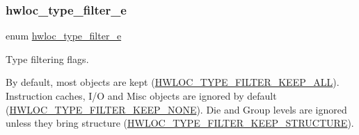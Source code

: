 \subsubsection{\texorpdfstring{hwloc\+\_\+type\+\_\+filter\+\_\+e}{hwloc\_type\_filter\_e}}
{\footnotesize\ttfamily enum \hyperlink{a00193_ga9a5a1f0140cd1952544477833733195b}{hwloc\+\_\+type\+\_\+filter\+\_\+e}}



Type filtering flags. 

By default, most objects are kept (\hyperlink{a00193_gga9a5a1f0140cd1952544477833733195bafda7b59e6810dfe778d8f9a4cc1e350e}{H\+W\+L\+O\+C\+\_\+\+T\+Y\+P\+E\+\_\+\+F\+I\+L\+T\+E\+R\+\_\+\+K\+E\+E\+P\+\_\+\+A\+LL}). Instruction caches, I/O and Misc objects are ignored by default (\hyperlink{a00193_gga9a5a1f0140cd1952544477833733195ba4f835955414de92c77d99b8419d4647a}{H\+W\+L\+O\+C\+\_\+\+T\+Y\+P\+E\+\_\+\+F\+I\+L\+T\+E\+R\+\_\+\+K\+E\+E\+P\+\_\+\+N\+O\+NE}). Die and Group levels are ignored unless they bring structure (\hyperlink{a00193_gga9a5a1f0140cd1952544477833733195ba7664716643bf1db83e631eed34f659e4}{H\+W\+L\+O\+C\+\_\+\+T\+Y\+P\+E\+\_\+\+F\+I\+L\+T\+E\+R\+\_\+\+K\+E\+E\+P\+\_\+\+S\+T\+R\+U\+C\+T\+U\+RE}).

